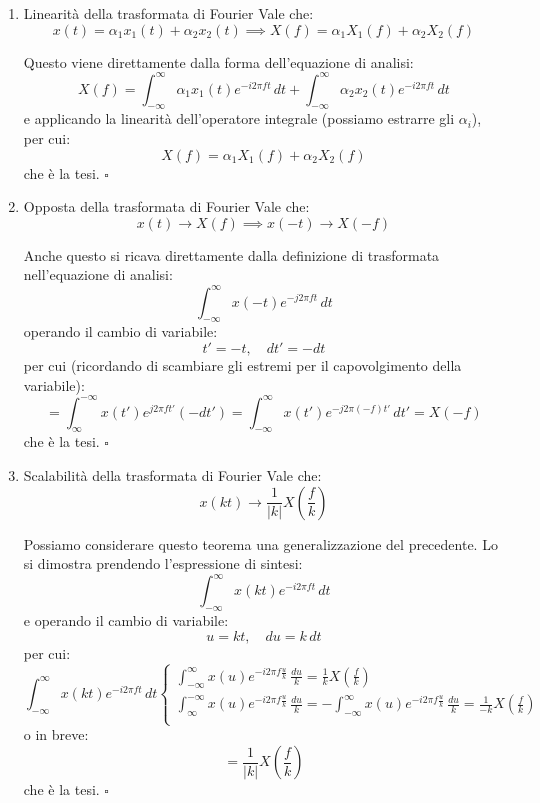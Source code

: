 \documentclass[a4paper,11pt]{article}
\begin{document}
\begin{enumerate}
\item \begin{theorem}{Linearità della trasformata di Fourier}
Vale che:
$$
x(t) = \alpha_1 x_1(t) + \alpha_2 x_2(t) \implies X(f) = \alpha_1 X_1(f) + \alpha_2 X_2(f)
$$
\end{theorem}
Questo viene direttamente dalla forma dell'equazione di analisi:
$$
X(f) = \int_{-\infty}^{\infty} \alpha_1 x_1(t) e^{-i 2 \pi  f t} \, dt + \int_{-\infty}^{\infty} \alpha_2 x_2(t) e^{-i 2 \pi  f t} \, dt
$$
e applicando la linearità dell'operatore integrale (possiamo estrarre gli $\alpha_i$), per cui:
$$
X(f) = \alpha_1 X_1(f) + \alpha_2 X_2(f)
$$
che è la tesi. \hfill $\square$

\item \begin{theorem}{Opposta della trasformata di Fourier}
Vale che:
$$
x(t) \rightarrow X(f) \implies x(-t) \rightarrow X(-f)
$$
\end{theorem}

Anche questo si ricava direttamente dalla definizione di trasformata nell'equazione di analisi:
$$
\int_{-\infty}^{\infty} x(-t) e^{-j 2 \pi f t} \, dt
$$
operando il cambio di variabile:
$$
t' = -t, \quad dt' = -dt
$$
per cui (ricordando di scambiare gli estremi per il capovolgimento della variabile):
$$
= \int_{\infty}^{-\infty} x(t') e^{j 2 \pi f t'} (-dt') = \int_{-\infty}^{\infty} x(t') e^{-j 2 \pi (-f) t'} \, dt' = X(-f)
$$
che è la tesi. \hfill $\square$

\item \begin{theorem}{Scalabilità della trasformata di Fourier}
Vale che:
$$
x(kt) \rightarrow \frac{1}{|k|} X\left(\frac{f}{k}\right) 
$$
\end{theorem}
Possiamo considerare questo teorema una generalizzazione del precedente. Lo si dimostra prendendo l'espressione di sintesi:
$$
\int_{-\infty}^{\infty} x(kt) e^{-i 2 \pi f t} \, dt
$$
e operando il cambio di variabile:
$$
u = kt, \quad du = k \, dt
$$
per cui:
$$
\int_{-\infty}^{\infty} x(kt) e^{-i 2 \pi f t} \, dt
\begin{cases}
\int_{-\infty}^{\infty} x(u) e^{-i 2 \pi f \frac{u}{k}} \, \frac{du}{k} = \frac{1}{k} X\left(\frac{f}{k}\right) \\
\int_{\infty}^{-\infty} x(u) e^{-i 2 \pi f \frac{u}{k}} \, \frac{du}{k} = - \int_{-\infty}^{\infty} x(u) e^{-i 2 \pi f \frac{u}{k}} \, \frac{du}{k} = \frac{1}{-k} X\left(\frac{f}{k}\right) \\
\end{cases}
$$
o in breve:
$$
= \frac{1}{|k|} X \left( \frac{f}{k} \right)
$$
che è la tesi. \hfill $\square$


\end{enumerate}
\end{document}
